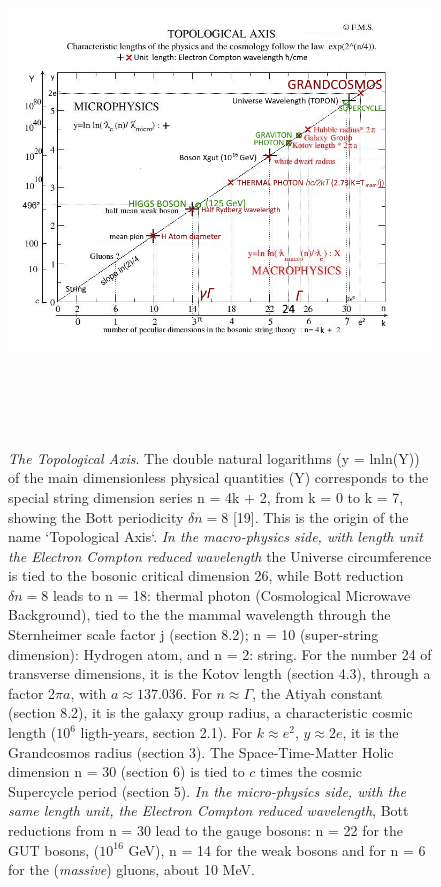 \documentclass[twoside,draft]{article}
\begin{document}
\begin{sloppypar}
\begin{figure}
\centering
\includegraphics[width=\textwidth,height=14cm]{./figures/figure}
\caption{\textit{The Topological Axis}. The double natural logarithms (y = lnln(Y)) of the main dimensionless physical quantities (Y) corresponds to the special string dimension series n = 4k + 2, from k = 0 to k = 7, showing the Bott
periodicity $\delta n = 8$ [19]. This is the origin of the name `Topological Axis`. 
\textit{In the macro-physics side, with length unit the Electron Compton reduced wavelength} the Universe circumference 
    is tied to the bosonic critical dimension 26, while Bott reduction $\delta n = 8$ leads to n = 18: thermal photon (Cosmological Microwave Background), tied to the the mammal wavelength through the Sternheimer scale factor j (section 8.2); n = 10 (super-string dimension): Hydrogen atom, and n = 2: string. For the number 24 of transverse dimensions, it is
    the Kotov length (section 4.3), through a factor 2$\pi a$, with $a \approx 137.036$. For $n \approx \Gamma $, the Atiyah constant (section 8.2), it is the galaxy group radius, a characteristic cosmic length ($10^{6}$ ligth-years, section 2.1). For $k \approx e^{2}$, $y \approx 2e$, it is the Grandcosmos radius (section 3). The Space-Time-Matter Holic dimension n = 30 (section 6) is tied to $c$ times the cosmic Supercycle period (section 5). \textit{In the micro-physics side, with the same length unit, the Electron Compton reduced wavelength}, Bott reductions from n = 30 lead to the gauge bosons: n = 22 for the GUT bosons, ($10^{16}$ GeV), n = 14 for the weak bosons and for n = 6 for the (\textit{massive}) gluons, about 10 MeV.
}
\end{figure}
\end{sloppypar}
\end{document}
